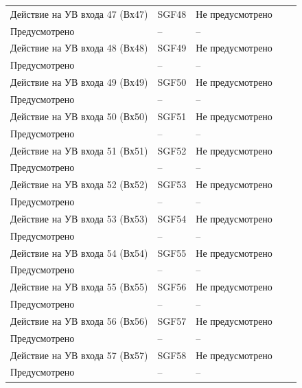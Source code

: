 \begin{longtable}{|>{\centering\arraybackslash}m{5.3cm}|>{\centering\arraybackslash}m{3.3cm}|>{\centering\arraybackslash}m{4.2cm}|>{\centering\arraybackslash}m{1.8cm}|>{\centering\arraybackslash}m{1cm}|}
\hline
\centering Действие на УВ входа 47 (Вх47)  & \centering SGF48 & \centering Не предусмотрено \\ Предусмотрено & \centering -- & \centering \arraybackslash -- \\
\hline
\centering Действие на УВ входа 48 (Вх48)  & \centering SGF49 & \centering Не предусмотрено \\ Предусмотрено & \centering -- & \centering \arraybackslash -- \\
\hline
\centering Действие на УВ входа 49 (Вх49)  & \centering SGF50 & \centering Не предусмотрено \\ Предусмотрено & \centering -- & \centering \arraybackslash -- \\
\hline
\centering Действие на УВ входа 50 (Вх50)  & \centering SGF51 & \centering Не предусмотрено \\ Предусмотрено & \centering -- & \centering \arraybackslash -- \\
\hline
\centering Действие на УВ входа 51 (Вх51)  & \centering SGF52 & \centering Не предусмотрено \\ Предусмотрено & \centering -- & \centering \arraybackslash -- \\
\hline
\centering Действие на УВ входа 52 (Вх52)  & \centering SGF53 & \centering Не предусмотрено \\ Предусмотрено & \centering -- & \centering \arraybackslash -- \\
\hline
\centering Действие на УВ входа 53 (Вх53)  & \centering SGF54 & \centering Не предусмотрено \\ Предусмотрено & \centering -- & \centering \arraybackslash -- \\
\hline
\centering Действие на УВ входа 54 (Вх54)  & \centering SGF55 & \centering Не предусмотрено \\ Предусмотрено & \centering -- & \centering \arraybackslash -- \\
\hline
\centering Действие на УВ входа 55 (Вх55)  & \centering SGF56 & \centering Не предусмотрено \\ Предусмотрено & \centering -- & \centering \arraybackslash -- \\
\hline
\centering Действие на УВ входа 56 (Вх56)  & \centering SGF57 & \centering Не предусмотрено \\ Предусмотрено & \centering -- & \centering \arraybackslash -- \\
\hline
\centering Действие на УВ входа 57 (Вх57)  & \centering SGF58 & \centering Не предусмотрено \\ Предусмотрено & \centering -- & \centering \arraybackslash -- \\

\end{longtable}
